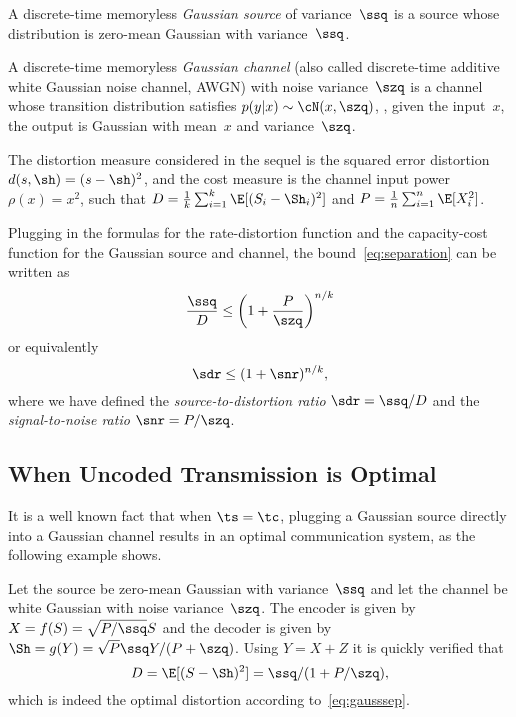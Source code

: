 \begin{definition}
  \label{def:gaussiansc}
  A discrete-time memoryless \emph{Gaussian source} of variance~$\ssq$ is a
  source whose distribution is zero-mean Gaussian with variance~$\ssq$.

  A discrete-time memoryless \emph{Gaussian channel} (also called discrete-time
  additive white Gaussian noise channel, AWGN) with noise variance~$\szq$ is a
  channel whose transition distribution satisfies $p(y|x) \sim \cN(x, \szq)$,
  \ie, given the input~$x$, the output is Gaussian with mean~$x$ and
  variance~$\szq$.
\end{definition}

The distortion measure considered in the sequel is the squared error distortion
$d(s,\sh) = (s - \sh)^2$, and the cost measure is the channel input power
$\rho(x) = x^2$, such that $D = \frac1k \sum_{i=1}^k \E[(S_i - \Sh_i)^2]$ and $P
= \frac1n \sum_{i=1}^n \E[X_i^2]$.

Plugging in the formulas for the rate-distortion function and the capacity-cost
function for the Gaussian source and channel, the bound~\eqref{eq:separation}
can be written as
\begin{equation}
  \label{eq:gausssep}
  \frac{\ssq}{D} \le \left( 1 + \frac{P}{\szq} \right)^{n/k}
\end{equation}
or equivalently
\begin{equation}
  \label{eq:gausssepsdr}
  \sdr \le (1 + \snr)^{n/k},
\end{equation}
where we have defined the \emph{source-to-distortion ratio} $\sdr = \ssq/D$ and
the \emph{signal-to-noise ratio} $\snr = P/\szq$. 


\subsection{When Uncoded Transmission is Optimal}

It is a well known fact that when $\ts = \tc$, plugging a Gaussian source
directly into a Gaussian channel results in an optimal communication system, as
the following example shows. 

\begin{example}
  \label{ex:gausssingle}
  Let the source be zero-mean Gaussian with variance~$\ssq$ and let the channel
  be white Gaussian with noise variance~$\szq$. The encoder is given by $X =
  f(S) = \sqrt{P/\ssq} S$ and the decoder is given by $\Sh = g(Y) = \sqrt{P}
  \ssq Y / (P + \szq)$. Using $Y = X + Z$ it is quickly verified that
  \begin{equation*}
    D = \E[(S - \Sh)^2] = \ssq / (1 + P/\szq),
  \end{equation*}
  which is indeed the optimal distortion according to~\eqref{eq:gausssep}.
\end{example}

